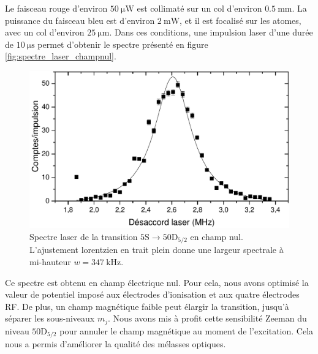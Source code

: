 Le faisceau rouge d'environ $\SI{50}{\micro\watt}$ est collimaté sur un col d'environ $\SI{0.5}{\mm}$.
La puissance du faisceau bleu est d'environ $\SI{2}{\milli\watt}$, et il est focalisé sur les atomes, avec un col d'environ $\SI{25}{\um}$.
Dans ces conditions, une impulsion laser d'une durée de $\SI{10}{\us}$ permet d'obtenir le spectre présenté en figure \eqref{fig:spectre_laser_champnul}.
%
\begin{figure}[!h]
\centering
\includegraphics[width=0.85\linewidth]{figures/circulars/spectre_laser_champnul}
\caption[Spectre laser de la transition $\mathrm{5S\rightarrow 50D_{5/2}}$ en champ nul]{
Spectre laser de la transition $\mathrm{5S\rightarrow 50D_{5/2}}$ en champ nul.
L'ajustement lorentzien en trait plein donne une largeur spectrale à mi-hauteur $w =\SI{347}{\kHz}$.
}
\label{fig:spectre_laser_champnul}
\end{figure}

Ce spectre est obtenu en champ électrique nul.
Pour cela, nous avons optimisé la valeur de potentiel imposé aux électrodes d'ionisation et aux quatre électrodes RF.
De plus, un champ magnétique faible peut élargir la transition, jusqu'à séparer les sous-niveaux $m_j$.
Nous avons mis à profit cette sensibilité Zeeman du niveau $\mathrm{50D_{5/2}}$ pour annuler le champ magnétique au moment de l'excitation.
Cela nous a permis d'améliorer la qualité des mélasses optiques.
		
